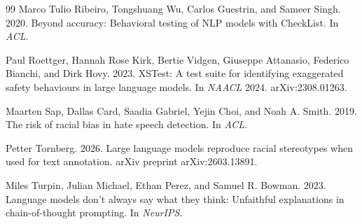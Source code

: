\documentclass[10pt,a4paper,twocolumn]{article}
\begin{document}
\begin{thebibliography}{99}
Marco Tulio Ribeiro, Tongshuang Wu, Carlos Guestrin, and Sameer Singh. 2020. Beyond accuracy: Behavioral testing of NLP models with CheckList. In \emph{ACL}.

Paul Roettger, Hannah Rose Kirk, Bertie Vidgen, Giuseppe Attanasio, Federico Bianchi, and Dirk Hovy. 2023. XSTest: A test suite for identifying exaggerated safety behaviours in large language models. In \emph{NAACL} 2024. arXiv:2308.01263.

Maarten Sap, Dallas Card, Saadia Gabriel, Yejin Choi, and Noah A. Smith. 2019. The risk of racial bias in hate speech detection. In \emph{ACL}.

Petter Tornberg. 2026. Large language models reproduce racial stereotypes when used for text annotation. arXiv preprint arXiv:2603.13891.

Miles Turpin, Julian Michael, Ethan Perez, and Samuel R. Bowman. 2023. Language models don't always say what they think: Unfaithful explanations in chain-of-thought prompting. In \emph{NeurIPS}.

\end{thebibliography}
\end{document}
